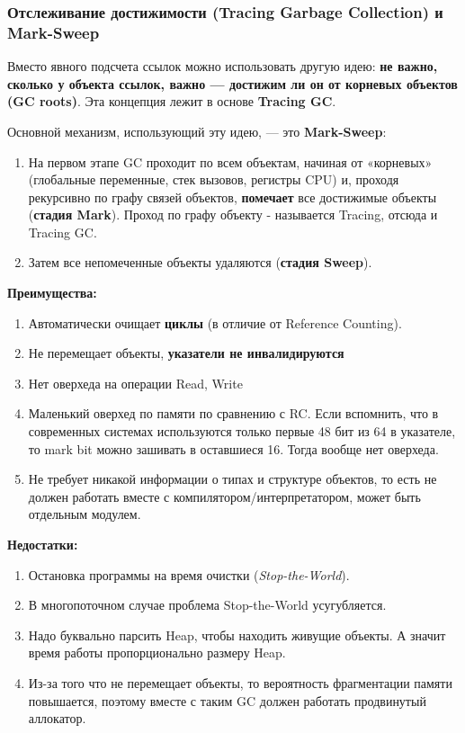 \subsubsection{Отслеживание достижимости (Tracing Garbage Collection) и Mark-Sweep}

Вместо явного подсчета ссылок можно использовать другую идею: \textbf{не важно, сколько у объекта ссылок, важно — достижим ли он от корневых объектов (GC roots)}. Эта концепция лежит в основе \textbf{Tracing GC}.

Основной механизм, использующий эту идею, — это \textbf{Mark-Sweep}:
\begin{enumerate}[label=\arabic*.]
    \item На первом этапе GC проходит по всем объектам, начиная от «корневых» (глобальные переменные, стек вызовов, регистры CPU) и, проходя рекурсивно по графу связей объектов, \textbf{помечает} все достижимые объекты (\textbf{стадия Mark}). Проход по графу объекту - называется Tracing, отсюда и Tracing GC.
    \item Затем все непомеченные объекты удаляются (\textbf{стадия Sweep}).
\end{enumerate}

\textbf{Преимущества:}
\begin{enumerate}[label=\arabic*.]
    \item Автоматически очищает \textbf{циклы} (в отличие от Reference Counting).
    \item Не перемещает объекты, \textbf{указатели не инвалидируются}
    \item Нет оверхеда на операции Read, Write
    \item Маленький оверхед по памяти по сравнению с RC. Если вспомнить, что в современных системах используются только первые 48 бит из 64 в указателе, то mark bit можно зашивать в оставшиеся 16. Тогда вообще нет оверхеда.
    \item Не требует никакой информации о типах и структуре объектов, то есть не должен работать вместе с компилятором/интерпретатором, может быть отдельным модулем.
\end{enumerate}

\textbf{Недостатки:}
\begin{enumerate}[label=\arabic*.]
    \item Остановка программы на время очистки (\textit{Stop-the-World}).
    \item В многопоточном случае проблема Stop-the-World усугубляется.
    \item Надо буквально парсить Heap, чтобы находить живущие объекты. А значит время работы пропорционально размеру Heap.
    \item Из-за того что не перемещает объекты, то вероятность фрагментации памяти повышается, поэтому вместе с таким GC должен работать продвинутый аллокатор.
\end{enumerate}

